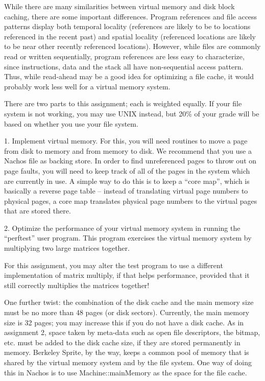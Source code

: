While there are many similarities between virtual memory and disk
block caching, there are some important differences.
Program references and file access patterns display both temporal 
locality (references are likely to be to locations referenced
in the recent past) and spatial locality (referenced locations are likely
to be near other recently referenced locations).  However, while
files are commonly read or written sequentially, program
references are less easy to characterize, since instructions, data
and the stack all have non-sequential access pattern.
Thus, while read-ahead may be a good idea for optimizing a file cache,
it would probably work less well for a virtual memory system.

There are two parts to this assignment; each is weighted equally.
If your file system is not working, you may use UNIX instead, but
20\% of your grade will be based on whether you use
your file system.  

\begin{description}
\item{1.}
Implement virtual memory.  For this, you will need routines
to move a page from disk to memory and from memory to disk.
We recommend that you use a Nachos file as backing store.
In order to find
unreferenced pages to throw out on page faults, you will need
to keep track of all of the pages in the system which are currently
in use.  A simple way to do this is to keep a ``core map'', which
is basically a reverse page table -- instead of translating virtual
page numbers to physical pages, a core map translates physical page numbers
to the virtual pages that are stored there.

\item{2.}
Optimize the performance of your virtual memory system
in running the ``perftest'' user program.  This program 
exercises the virtual memory system by multiplying
two large matrices together.

For this assignment, you may alter the test program to use
a different implementation of matrix multiply, if that helps 
performance, provided that it still correctly multiplies the matrices 
together!

One further twist: the combination of the disk cache and the main
memory size must be no more than 48 pages (or disk sectors).  
Currently, the main memory size is 32 pages; you may increase this
if you do not have a disk cache.  As in assignment 2, space taken
by meta-data such as open file descriptors, the bitmap, etc. must be 
added to the disk cache size, if they are stored permanently in memory.
Berkeley Sprite, by the way, keeps a common pool of memory that is shared by
the virtual memory system and by the file system.  One way of doing
this in Nachos is to use Machine::mainMemory as the space for the file cache.

\end{description}


